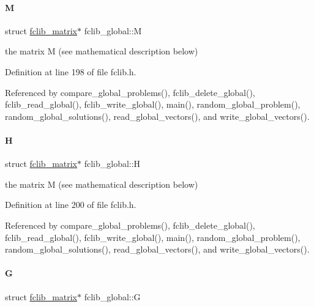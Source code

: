 \paragraph{\texorpdfstring{M}{M}}
{\footnotesize\ttfamily struct \mbox{\hyperlink{structfclib__matrix}{fclib\+\_\+matrix}}$\ast$ fclib\+\_\+global\+::M}



the matrix M (see mathematical description below) 



Definition at line 198 of file fclib.\+h.



Referenced by compare\+\_\+global\+\_\+problems(), fclib\+\_\+delete\+\_\+global(), fclib\+\_\+read\+\_\+global(), fclib\+\_\+write\+\_\+global(), main(), random\+\_\+global\+\_\+problem(), random\+\_\+global\+\_\+solutions(), read\+\_\+global\+\_\+vectors(), and write\+\_\+global\+\_\+vectors().

\mbox{\label{structfclib__global_ac87d5553d144625b9006e2e8b0c89b3c}} 
\paragraph{\texorpdfstring{H}{H}}
{\footnotesize\ttfamily struct \mbox{\hyperlink{structfclib__matrix}{fclib\+\_\+matrix}}$\ast$ fclib\+\_\+global\+::H}



the matrix M (see mathematical description below) 



Definition at line 200 of file fclib.\+h.



Referenced by compare\+\_\+global\+\_\+problems(), fclib\+\_\+delete\+\_\+global(), fclib\+\_\+read\+\_\+global(), fclib\+\_\+write\+\_\+global(), main(), random\+\_\+global\+\_\+problem(), random\+\_\+global\+\_\+solutions(), read\+\_\+global\+\_\+vectors(), and write\+\_\+global\+\_\+vectors().

\mbox{\label{structfclib__global_a897c09aca4a010076ed9ddb3f7527a79}} 
\paragraph{\texorpdfstring{G}{G}}
{\footnotesize\ttfamily struct \mbox{\hyperlink{structfclib__matrix}{fclib\+\_\+matrix}}$\ast$ fclib\+\_\+global\+::G}



